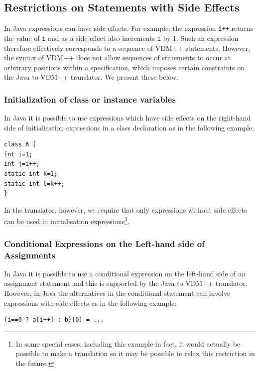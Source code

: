 \documentclass[\pformat,12pt]{article}
\begin{document}
\subsection{Restrictions on Statements with Side Effects}

In Java expressions can have side effects. For example, the expression
\texttt{i++} returns the value of \texttt{i} and as a side-effect also
increments \texttt{i} by 1. Such an expression therefore effectively
corresponds to a sequence of VDM++ statements. However, the syntax of
VDM++ does not allow sequences of statements to occur at arbitrary
positions within a specification, which imposes certain constraints on
the Java to VDM++ translator. We present these below.

\subsubsection{Initialization of class or instance variables}

In Java it is possible to use expressions which have side effects on
the right-hand side of initialisation expressions in a class
declaration as in the following example:

\begin{small}
\begin{verbatim}
class A {
int i=1;
int j=i++;
static int k=1;
static int l=k++;
}
\end{verbatim}
\end{small}

In the translator, however, we require that only expressions without
side effects can be used in initialisation expressions\footnote{In
  some special cases, including this example in fact, it would
  actually be possible to make a translation so it may be possible to
  relax this restriction in the future.}.

\subsubsection{Conditional Expressions on the Left-hand side of Assignments}

In Java it is possible to use a conditional expression on the
left-hand side of an assignment statement and this is supported by the
Java to VDM++ translator. However, in Java the alternatives in the
conditional statement can involve expressions with side effects as in
the following example:

\begin{small}
\begin{verbatim}
(i==0 ? a[i++] : b)[0] = ...
\end{verbatim}
\end{small}
\end{document}
